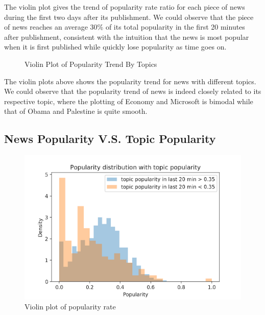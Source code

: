 \documentclass{article}
\begin{document}
The violin plot gives the trend of popularity rate ratio for each piece of news during the first two days after its publishment. We could observe that the piece of news reaches an average 30\% of its total popularity in the first 20 minutes after publishment, consistent with the intuition that the news is most popular when it is first published while quickly lose popularity as time goes on.

\begin{figure}[H]
    \centering
    \caption{Violin Plot of Popularity Trend By Topics}
\end{figure}

The violin plots above shows the popularity trend for news with different topics. We could observe that the popularity trend of news is indeed closely related to its respective topic, where the plotting of Economy and Microsoft is bimodal while that of Obama and Palestine is quite smooth.


\subsection{News Popularity V.S. Topic Popularity}

\begin{figure}[H]
\centering
\includegraphics[scale=0.45]{"popu distrib 20m"}
\caption{Violin plot of popularity rate}
\end{figure}
\end{document}
